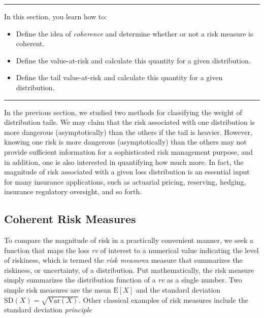 \documentclass[]{book}
\providecommand{\tightlist}{%
  \setlength{\itemsep}{0pt}\setlength{\parskip}{0pt}}
\theoremstyle{definition}
\theoremstyle{definition}
\theoremstyle{definition}
\theoremstyle{remark}
\begin{document}
\begin{center}\rule{0.5\linewidth}{\linethickness}\end{center}

In this section, you learn how to:

\begin{itemize}
\tightlist
\item
  Define the idea of \emph{coherence} and determine whether or not a
  risk measure is coherent.
\item
  Define the value-at-risk and calculate this quantity for a given
  distribution.
\item
  Define the tail value-at-risk and calculate this quantity for a given
  distribution.
\end{itemize}

\begin{center}\rule{0.5\linewidth}{\linethickness}\end{center}

In the previous section, we studied two methods for classifying the
weight of distribution tails. We may claim that the risk associated with
one distribution is more dangerous (asymptotically) than the others if
the tail is heavier. However, knowing one risk is more dangerous
(asymptotically) than the others may not provide sufficient information
for a sophisticated risk management purpose, and in addition, one is
also interested in quantifying how much more. In fact, the magnitude of
risk associated with a given loss distribution is an essential input for
many insurance applications, such as actuarial pricing, reserving,
hedging, insurance regulatory oversight, and so forth.

\subsection{Coherent Risk Measures}\label{coherent-risk-measures}

To compare the magnitude of risk in a practically convenient manner, we
seek a function that maps the loss \emph{rv} of interest to a numerical
value indicating the level of riskiness, which is termed the \emph{risk
measure}{a measure that summarizes the riskiness, or uncertainty, of a
distribution}. Put mathematically, the risk measure simply summarizes
the distribution function of a \emph{rv} as a single number. Two simple
risk measures are the mean \(\mathrm{E}[X]\) and the standard deviation
\(\mathrm{SD}(X)=\sqrt{\mathrm{Var}(X)}\). Other classical examples of
risk measures include the standard deviation \emph{principle}
\end{document}
